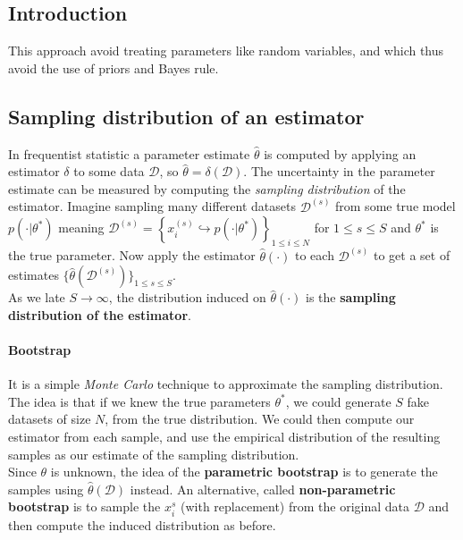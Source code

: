 \subsection{Introduction}
This approach avoid treating parameters like random variables, and which thus avoid the 
use of priors and Bayes rule.


\subsection{Sampling distribution of an estimator}
In frequentist statistic a parameter estimate $\hat{\theta}$ is computed by applying an
estimator $\delta$ to some data $\mathcal{D}$, so $\hat{\theta}=\delta(\mathcal{D})$.
The uncertainty in the parameter estimate can be measured by computing the \emph{sampling
distribution} of the estimator.
Imagine sampling many different datasets $\mathcal{D}^{(s)}$ from some true model 
$p(\cdot|\theta^{*})$ meaning $\mathcal{D}^{(s)}=\left\{x_{i}^{(s)}\hookrightarrow 
p(\cdot|\theta^{*})\right\}_{1\leq i\leq N}$ for $1\leq s\leq S$ and $\theta^{*}$ is the 
true parameter. Now apply the estimator $\hat{\theta}(\cdot)$ to each $\mathcal{D}^{(s)}$
to get a set of estimates $\{\hat{\theta}(\mathcal{D}^{(s)})\}_{1\leq s\leq S}$.\\
As we late $S \rightarrow \infty$, the distribution induced on $\hat{\theta}(\cdot)$ is 
the \textbf{sampling distribution of the estimator}.

\paragraph{Bootstrap}
It is a simple \emph{Monte Carlo} technique to approximate the sampling 
distribution.
The idea is that if we knew the true parameters $\theta^{*}$, we could generate $S$ fake 
datasets of size $N$, from the true distribution. We could then compute our estimator from
each sample, and use the empirical distribution of the resulting samples as our estimate
of the sampling distribution.\\
Since $\theta$ is unknown, the idea of the \textbf{parametric bootstrap} is to generate
the samples using $\hat{\theta}(\mathcal{D})$ instead.
An alternative, called \textbf{non-parametric bootstrap} is to sample the $x_{i}^{s}$
(with replacement) from the original data $\mathcal{D}$ and then compute the induced
distribution as before.

